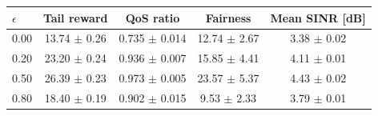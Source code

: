 \begin{tabular}{lcccc}
\hline
$\epsilon$ & \textbf{Tail reward} & \textbf{QoS ratio} & \textbf{Fairness} & \textbf{Mean SINR [dB]} \\
\hline
0.00 & 13.74 $\pm$ 0.26 & 0.735 $\pm$ 0.014 & 12.74 $\pm$ 2.67 & 3.38 $\pm$ 0.02 \\
0.20 & 23.20 $\pm$ 0.24 & 0.936 $\pm$ 0.007 & 15.85 $\pm$ 4.41 & 4.11 $\pm$ 0.01 \\
0.50 & 26.39 $\pm$ 0.23 & 0.973 $\pm$ 0.005 & 23.57 $\pm$ 5.37 & 4.43 $\pm$ 0.02 \\
0.80 & 18.40 $\pm$ 0.19 & 0.902 $\pm$ 0.015 & 9.53 $\pm$ 2.33 & 3.79 $\pm$ 0.01 \\
\hline
\end{tabular}